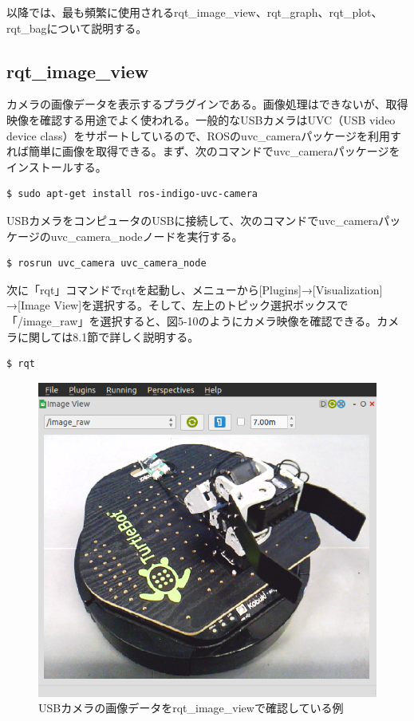 以降では、最も頻繁に使用されるrqt\_image\_view、rqt\_graph、rqt\_plot、rqt\_bagについて説明する。

\subsection{rqt\_image\_view}

カメラの画像データを表示するプラグインである。画像処理はできないが、取得映像を確認する用途でよく使われる。一般的なUSBカメラはUVC（USB video device class）をサポートしているので、ROSのuvc\_cameraパッケージを利用すれば簡単に画像を取得できる。まず、次のコマンドでuvc\_cameraパッケージをインストールする。

\begin{lstlisting}[language=ROS]
$ sudo apt-get install ros-indigo-uvc-camera
\end{lstlisting}

USBカメラをコンピュータのUSBに接続して、次のコマンドでuvc\_cameraパッケージのuvc\_camera\_nodeノードを実行する。

\begin{lstlisting}[language=ROS]
$ rosrun uvc_camera uvc_camera_node
\end{lstlisting}

次に「rqt」コマンドでrqtを起動し、メニューから[Plugins]→[Visualization] →[Image View]を選択する。そして、左上のトピック選択ボックスで「/image\_raw」を選択すると、図5-10のようにカメラ映像を確認できる。カメラに関しては8.1節で詳しく説明する。

\begin{lstlisting}[language=ROS]
$ rqt
\end{lstlisting}

\begin{figure}[h]
  \centering
  \includegraphics[width=\columnwidth]{pictures/chapter5/pic_05_10.png}
  \caption{USBカメラの画像データをrqt\_image\_viewで確認している例}
\end{figure}


